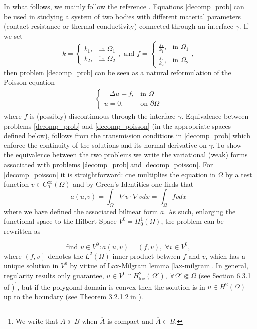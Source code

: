 In what follows, we mainly follow the reference \cite{quarteroni1999domain}. Equations \eqref{decomp_prob} can be used in studying a system of two bodies with different material parameters (contact resistance or thermal conductivity) connected through an interface \(\gamma\). If we set
\[
k = \begin{cases}
    k_1,& \text{in } \Omega_1\\
    k_2,& \text{in } \Omega_2
\end{cases}, \text{ and }
f = \begin{cases}
    \frac{f_1}{k_1},& \text{in } \Omega_1\\
    \frac{f_2}{k_2},& \text{in } \Omega_2
\end{cases},
\]
then problem \eqref{decomp_prob} can be seen as a natural reformulation of the Poisson equation
\begin{align}\label{decomp_poisson}
    \begin{cases}
        -\Delta u = f, & \text{in }\Omega \\
        u = 0, & \text{on } \partial\Omega
    \end{cases}
\end{align}
where \(f\) is (possibly) discontinuous through the interface \(\gamma\). Equivalence between problems \eqref{decomp_prob} and \eqref{decomp_poisson} (in the appropriate spaces defined below), follows from the transmission conditions in \eqref{decomp_prob} which enforce the continuity of the solutions and its normal derivative on \(\gamma\). To show the equivalence between the two problems we write the variational (weak) forms associated with problems \eqref{decomp_prob} and \eqref{decomp_poisson}. For \eqref{decomp_poisson} it is straightforward: one multiplies the equation in \(\Omega\) by a test function \(v \in C^\infty_0(\Omega)\) and by Green's Identities one finds that
\[
a(u,v)=\int_\Omega \nabla u \cdot \nabla v dx = \int_\Omega f v dx
\]
where we have defined the associated bilinear form \(a\). As such, enlarging the functional space to the Hilbert Space \(V^0=H^1_0(\Omega)\), the problem can be rewritten as

\begin{equation}\label{weak_poisson}
    \text{find } u \in V^0: a(u,v) = (f, v), \; \forall v \in V^0,
\end{equation}
where \((f,v)\) denotes the \(L^2(\Omega)\) inner product between \(f\) and \(v\), which has a unique solution in \(V^0\) by virtue of Lax-Milgram lemma \ref{lax-milgram}. In general, regularity results only guarantee, \(u \in V^0 \cap H^2_{\text{loc}}(\Omega'), \; \forall \Omega' \Subset \Omega\) (see Section 6.3.1 of \cite{evans2022partial})\footnote{We write that \(A \Subset B\) when \(\overline{A}\) is compact and \(\overline{A} \subset B\).}, but if the polygonal domain is convex then the solution is in \(u \in H^2(\Omega)\) up to the boundary (see Theorem 3.2.1.2 in \cite{grisvard2011elliptic}).

